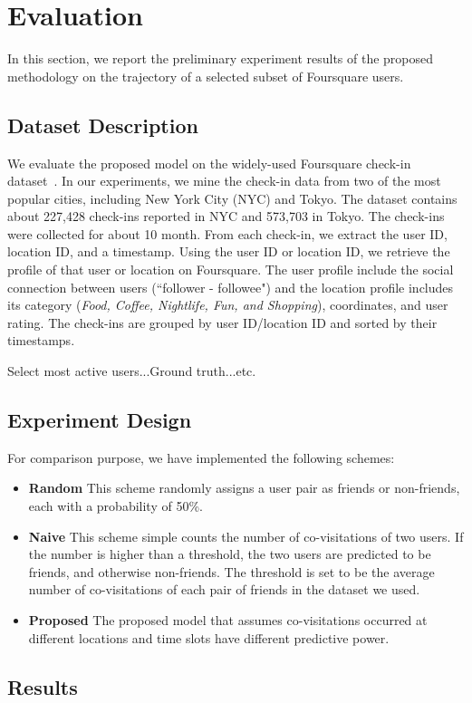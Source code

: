 \section{Evaluation} \label{sec:evaluation}

In this section, we report the preliminary experiment results of the proposed methodology on the trajectory of a selected subset of Foursquare users.

\subsection{Dataset Description}

We evaluate the proposed model on the widely-used Foursquare check-in dataset~\cite{yang2015nationtelescope}. In our experiments, we mine the check-in data from two of the most popular cities, including New York City (NYC) and Tokyo. The dataset contains about 227,428 check-ins reported in NYC and 573,703 in Tokyo. The check-ins were collected for about 10 month. From each check-in, we extract the user ID, location ID, and a timestamp. Using the user ID or location ID, we retrieve the profile of that user or location on Foursquare. The user profile include the social connection between users (``follower - followee") and the location profile includes its category (\textit{Food, Coffee, Nightlife, Fun, and Shopping}), coordinates, and user rating. The check-ins are grouped by user ID/location ID and sorted by their timestamps.


Select most active users...Ground truth...etc.

\subsection{Experiment Design}

For comparison purpose, we have implemented the following schemes:
\begin{itemize}
\item \textbf{Random} This scheme randomly assigns a user pair as friends or non-friends, each with a probability of 50\%.

\item \textbf{Naive} This scheme simple counts the number of co-visitations of two users. If the number is higher than a threshold, the two users are predicted to be friends, and otherwise non-friends. The threshold is set to be the average number of co-visitations of each pair of friends in the dataset we used.

\item \textbf{Proposed} The proposed model that assumes co-visitations occurred at different locations and time slots have different predictive power.
\end{itemize}

\subsection{Results}

